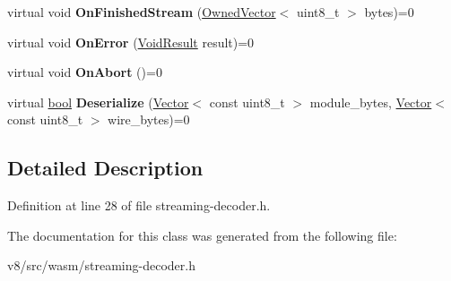 \begin{DoxyCompactItemize}
\mbox{\label{classv8_1_1internal_1_1wasm_1_1StreamingProcessor_a570044ec5da9364829684e438e3ea7be}} 
virtual void {\bfseries On\+Finished\+Stream} (\mbox{\hyperlink{classv8_1_1internal_1_1OwnedVector}{Owned\+Vector}}$<$ uint8\+\_\+t $>$ bytes)=0
\item 
\mbox{\label{classv8_1_1internal_1_1wasm_1_1StreamingProcessor_ac94a2f0d5477a90e259ff0693cbc894a}} 
virtual void {\bfseries On\+Error} (\mbox{\hyperlink{classv8_1_1internal_1_1wasm_1_1Result}{Void\+Result}} result)=0
\item 
\mbox{\label{classv8_1_1internal_1_1wasm_1_1StreamingProcessor_af11adece44483b8191cd1c8feb616224}} 
virtual void {\bfseries On\+Abort} ()=0
\item 
\mbox{\label{classv8_1_1internal_1_1wasm_1_1StreamingProcessor_addea0a6c3f20b121137f0acca0a3bc24}} 
virtual \mbox{\hyperlink{classbool}{bool}} {\bfseries Deserialize} (\mbox{\hyperlink{classv8_1_1internal_1_1Vector}{Vector}}$<$ const uint8\+\_\+t $>$ module\+\_\+bytes, \mbox{\hyperlink{classv8_1_1internal_1_1Vector}{Vector}}$<$ const uint8\+\_\+t $>$ wire\+\_\+bytes)=0
\end{DoxyCompactItemize}


\subsection{Detailed Description}


Definition at line 28 of file streaming-\/decoder.\+h.



The documentation for this class was generated from the following file\+:\begin{DoxyCompactItemize}
\item 
v8/src/wasm/streaming-\/decoder.\+h\end{DoxyCompactItemize}
